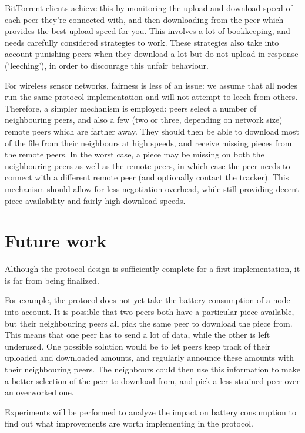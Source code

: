 \documentclass[ DIV=calc,%
                paper=a4,%
                fontsize=12pt,%
                twocolumn%
              ]{scrartcl}	 			%
\begin{document}
BitTorrent clients achieve this by monitoring the upload and download speed of each peer they're connected with, and then downloading from the peer which provides the best upload speed for you. This involves a lot of bookkeeping, and needs carefully considered strategies to work. These strategies also take into account punishing peers when they download a lot but do not upload in response (`leeching'), in order to discourage this unfair behaviour.

For wireless sensor networks, fairness is less of an issue: we assume that all nodes run the same protocol implementation and will not attempt to leech from others. Therefore, a simpler mechanism is employed: peers select a number of neighbouring peers, and also a few (two or three, depending on network size) remote peers which are farther away. They should then be able to download most of the file from their neighbours at high speeds, and receive missing pieces from the remote peers. In the worst case, a piece may be missing on both the neighbouring peers as well as the remote peers, in which case the peer needs to connect with a different remote peer (and optionally contact the tracker). This mechanism should allow for less negotiation overhead, while still providing decent piece availability and fairly high download speeds.

\section*{Future work}
Although the protocol design is sufficiently complete for a first implementation, it is far from being finalized.

For example, the protocol does not yet take the battery consumption of a node into account. It is possible that two peers both have a particular piece available, but their neighbouring peers all pick the same peer to download the piece from. This means that one peer has to send a lot of data, while the other is left underused. One possible solution would be to let peers keep track of their uploaded and downloaded amounts, and regularly announce these amounts with their neighbouring peers. The neighbours could then use this information to make a better selection of the peer to download from, and pick a less strained peer over an overworked one.

Experiments will be performed to analyze the impact on battery consumption to find out what improvements are worth implementing in the protocol.

\end{document}
